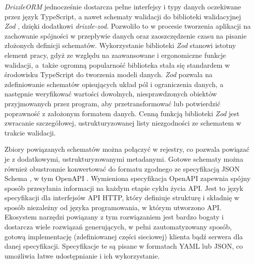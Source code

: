 \textit{DrizzleORM} jednocześnie dostarcza pełne interfejsy i typy danych oczekiwane przez język TypeScript, a nawet schematy walidacji do biblioteki walidacyjnej \textit{Zod} \cite{zod}, dzięki dodatkowi \textit{drizzle-zod}. Pozwoliło to w procesie tworzenia aplikacji na zachowanie spójności w przepływie danych oraz zaoszczędzenie czasu na pisanie złożonych definicji schematów. Wykorzystanie biblioteki \textit{Zod} stanowi istotny element pracy, gdyż ze względu na zaawansowane i ergonomiczne funkcje walidacji, a~także ogromną popularność biblioteka stała się standardem w środowisku TypeScript do tworzenia modeli danych. \textit{Zod} pozwala na zdefiniowanie schematów opisujących układ pól i ograniczenia danych, a następnie weryfikować wartości dowolnych, niesprawdzonych obiektów przyjmowanych przez program, aby przetransformować lub potwierdzić poprawność z założonym formatem danych. Cenną funkcją biblioteki \textit{Zod} jest zwracanie szczegółowej, ustrukturyzowanej listy niezgodności ze schematem w trakcie walidacji. 

Zbiory powiązanych schematów można połączyć w rejestry, co pozwala powiązać je z dodatkowymi, ustrukturyzowanymi metadanymi. Gotowe schematy można również obustronnie konwertować do formatu zgodnego ze specyfikacją JSON Schema \cite{json_schema}, w tym OpenAPI \cite{openapi}. Wymieniona specyfikacja OpenAPI zapewnia spójny sposób przesyłania informacji na każdym etapie cyklu życia API. Jest to język specyfikacji dla interfejsów API HTTP, który definiuje strukturę i składnię w sposób niezależny od języka programowania, w którym utworzono API. Ekosystem narzędzi powiązany z tym rozwiązaniem jest bardzo bogaty i dostarcza wiele rozwiązań generujących, w pełni zautomatyzowany sposób, gotową implementację (zdefiniowanej części sieciowej) klienta bądź serwera dla danej specyfikacji. Specyfikacje te są pisane w formatach YAML lub JSON, co umożliwia łatwe udostępnianie i ich wykorzystanie.

